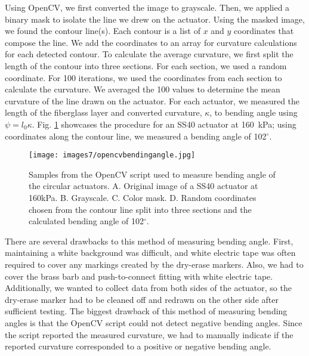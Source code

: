 Using OpenCV, we first converted the image to grayscale. Then, we applied a binary mask to isolate the line we drew on the actuator. Using the masked image, we found the contour line(s). Each contour is a list of $x$ and $y$ coordinates that compose the line. We add the coordinates to an array for curvature calculations for each detected contour. To calculate the average curvature, we first split the length of the contour into three sections. For each section, we used a random coordinate. For 100 iterations, we used the coordinates from each section to calculate the curvature. We averaged the 100 values to determine the mean curvature of the line drawn on the actuator. For each actuator, we measured the length of the fiberglass layer and converted curvature, $\kappa$, to bending angle using $\psi = l_{0}\kappa$. Fig. \ref{fig:opencvbendingangle} showcases the procedure for an SS40 actuator at 160~kPa; using coordinates along the contour line, we measured a bending angle of 102$^\circ$. 

\clearpage
\begin{figure}[ht]
    \centering
     \texttt{[image: images7/opencvbendingangle.jpg]}
    \caption{Samples from the OpenCV script used to measure bending angle of the circular actuators. A. Original image of a SS40 actuator at 160kPa. B. Grayscale. C. Color mask. D. Random coordinates chosen from the contour line split into three sections and the calculated bending angle of 102$^\circ$.}
    \label{fig:opencvbendingangle}
\end{figure}

There are several drawbacks to this method of measuring bending angle. First, maintaining a white background was difficult, and white electric tape was often required to cover any markings created by the dry-erase markers. Also, we had to cover the brass barb and push-to-connect fitting with white electric tape. Additionally, we wanted to collect data from both sides of the actuator, so the dry-erase marker had to be cleaned off and redrawn on the other side after sufficient testing. The biggest drawback of this method of measuring bending angles is that the OpenCV script could not detect negative bending angles. Since the script reported the measured curvature, we had to manually indicate if the reported curvature corresponded to a positive or negative bending angle. 